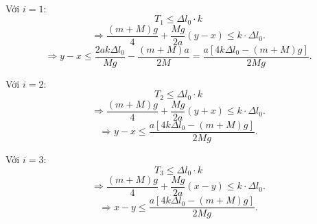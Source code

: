 \begin{enumerate}[label=(\alph*)]
\begin{enumerate}[label=(\roman*)]
    \\
    Với $i=1$:
    \begin{equation}
        T_1 \le \Delta l_0 \cdot k
    \end{equation}
    \begin{equation}
        \Longrightarrow \dfrac{(m+M)g}4 + \dfrac{Mg}{2a} (y-x)\le k \cdot \Delta l_0.
    \end{equation}
    \begin{equation}
    \label{eq:S4_05}
        \Longrightarrow y - x \le \dfrac{2ak\Delta l_0}{Mg}-\dfrac{(m+M)a}{2M} = \dfrac {a \left[4k \Delta l_0 - (m+M)g\right]}{2Mg}.
    \end{equation}

    Với $i=2$:
    \begin{equation}
        T_2 \le \Delta l_0 \cdot k
    \end{equation}
    \begin{equation}
        \Longrightarrow \dfrac{(m+M)g}4 + \dfrac{Mg}{2a} (y+x)\le k \cdot \Delta l_0.
    \end{equation}
    \begin{equation}
    \label{eq:S4_06}
        \Longrightarrow y - x \le  \dfrac {a \left[4k \Delta l_0 - (m+M)g\right]}{2Mg}.
    \end{equation}

    Với $i=3$:
    \begin{equation}
        T_3 \le \Delta l_0 \cdot k
    \end{equation}
    \begin{equation}
        \Longrightarrow \dfrac{(m+M)g}4 + \dfrac{Mg}{2a} (x-y)\le k \cdot \Delta l_0.
    \end{equation}
    \begin{equation}
    \label{eq:S4_07}
        \Longrightarrow x - y \le  \dfrac {a \left[4k \Delta l_0 - (m+M)g\right]}{2Mg}.
    \end{equation}


\end{enumerate}
\end{enumerate}
